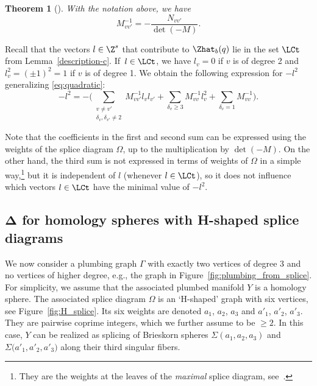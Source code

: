 \documentclass[10pt,a4paper]{amsart}
\newcounter{theorem}
\newtheorem{Theorem}{Theorem}[section]
\begin{document}
\begin{Theorem}[{\cite[Theorem~12.2]{NW05a}}]\label{theorem:neumann} With the notation above, we have
 \[
 M^{-1}_{vv'} = -\frac{N_{vv'}}{\det(- M)}.
 \]
\end{Theorem}

Recall that the vectors $l \in \Z^s$ that contribute to $\Zhat_b(q)$ lie in the set $\LCt$ from Lemma~\ref{description-c}. If~${l \in \LCt}$, we have $l_v=0$ if $v$ is of degree 2 and $l_v^2 = (\pm 1)^2=1$ if $v$ is of degree 1. We obtain the following expression for $-l^2$ generalizing \eqref{eq:quadratic}:
\begin{equation*}%
 -l^2 = - \biggl(\sum_{\substack{v \neq v'\\ \delta_v,\delta_{v'} \neq 2}} M^{-1}_{vv'} l_v l_{v'} + \sum_{\delta_v \geq 3} M^{-1}_{vv} l_v^2 + \sum_{\delta_v =1} M^{-1}_{vv} \biggr).
\end{equation*}

Note that the coefficients in the first and second sum can be expressed using the weights of the splice diagram $\Omega$, up to the multiplication by $\det(- M)$. On the other hand, the third sum is not expressed in terms of weights of $\Omega$ in a simple way,\footnote{They are the weights at the leaves of the \emph{maximal} splice diagram, see~\cite[p.~743]{NW05a}.} but it is independent of $l$ (whenever $l \in \LCt$), so it does not influence which vectors $l \in \LCt$ have the minimal value of $-l^2$.

\subsection[Delta for homology spheres with H-shaped splice diagrams]{$\boldsymbol{\Delta}$ for homology spheres with H-shaped splice diagrams} \label{ss:computation_h_shaped}

We now consider a plumbing graph $\Gamma$ with exactly two vertices of degree 3 and no vertices of higher degree, e.g., the graph in Figure~\ref{fig:plumbing_from_splice}. For simplicity, we assume that the associated plumbed manifold $Y$ is a homology sphere. The associated splice diagram $\Omega$ is an `H-shaped' graph with six vertices, see Figure~\ref{fig:H_splice}. Its six weights are denoted $a_1$, $a_2$, $a_3$ and $a'_1$, $a'_2$, $a'_3$. They are pairwise coprime integers, which we further assume to be $\geq 2$. In this case, $Y$ can be realized as splicing of Brieskorn spheres $\Sigma(a_1,a_2,a_3)$ and $\Sigma\bigl(a'_1,a'_2,a'_3\bigr)$ along their third singular fibers.
\end{document}
